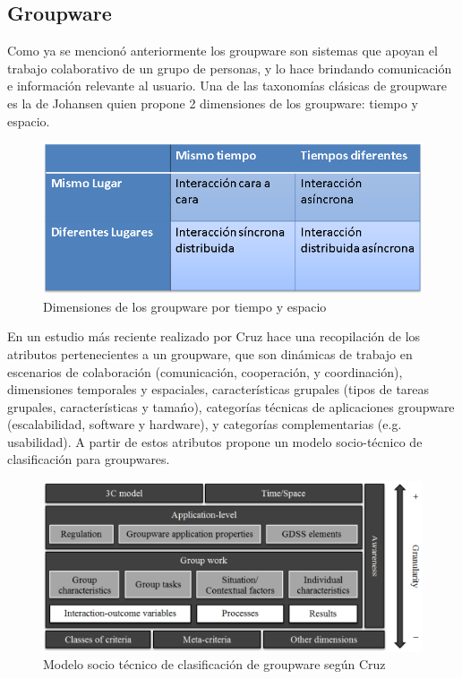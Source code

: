 \subsection{Groupware}
Como ya se mencion\'o anteriormente los groupware son sistemas que apoyan el trabajo colaborativo de un grupo de personas, y lo hace brindando comunicaci\'on e informaci\'on relevante al usuario. Una de las taxonom\'ias cl\'asicas de groupware es la de Johansen \cite{johansen1988groupware} quien propone 2 dimensiones de los groupware: tiempo y espacio.

\begin{figure}[h!]
  \centering
  \includegraphics[scale=0.5]{images/dimen}
  \caption{Dimensiones de los groupware por tiempo y espacio \cite{johansen1988groupware}}
\end{figure}

En un estudio m\'as reciente realizado por Cruz \cite{cruz2012towards} hace una recopilaci\'on de los atributos pertenecientes a un groupware, que son din\'amicas de trabajo en escenarios de colaboraci\'on (comunicaci\'on, cooperaci\'on, y coordinaci\'on), dimensiones temporales y espaciales, caracter\'isticas grupales (tipos de tareas grupales, caracter\'isticas y tama\'no), categor\'ias t\'ecnicas de aplicaciones groupware (escalabilidad, software y hardware), y categor\'ias complementarias (e.g. usabilidad). A partir de estos atributos propone un modelo socio-t\'ecnico de clasificaci\'on para groupwares.

\begin{figure}[h!]
  \centering
  \includegraphics[scale=0.9]{images/socclass}
  \caption{Modelo socio t\'ecnico de clasificaci\'on de groupware seg\'un Cruz \cite{cruz2012towards}}
\end{figure}

